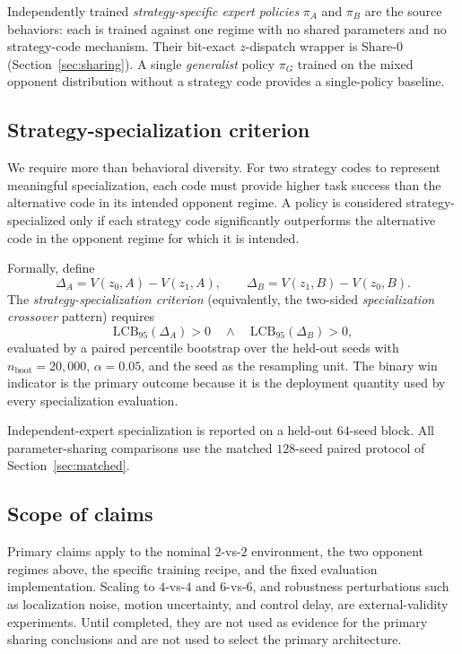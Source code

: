 Independently trained \emph{strategy-specific expert policies} $\pi_A$ and
$\pi_B$ are the source behaviors: each is trained against one regime with no
shared parameters and no strategy-code mechanism. Their bit-exact $z$-dispatch
wrapper is Share-0 (Section~\ref{sec:sharing}). A single \emph{generalist}
policy $\pi_G$ trained on the mixed opponent distribution without a strategy
code provides a single-policy baseline.

\subsection{Strategy-specialization criterion}
\label{sec:specialization}

We require more than behavioral diversity. For two strategy codes to represent
meaningful specialization, each code must provide higher task success than the
alternative code in its intended opponent regime. A policy is considered
strategy-specialized only if each strategy code significantly outperforms the
alternative code in the opponent regime for which it is intended.

Formally, define
\[
\Delta_A = V(z_0,A)-V(z_1,A),
\qquad
\Delta_B = V(z_1,B)-V(z_0,B).
\]
The \emph{strategy-specialization criterion} (equivalently, the two-sided
\emph{specialization crossover} pattern) requires
\[
\mathrm{LCB}_{95}(\Delta_A)>0
\quad\wedge\quad
\mathrm{LCB}_{95}(\Delta_B)>0,
\]
evaluated by a paired percentile bootstrap over the held-out seeds with
$n_{\mathrm{boot}}=20{,}000$, $\alpha=0.05$, and the seed as the resampling
unit. The binary win indicator is the primary outcome because it is the
deployment quantity used by every specialization evaluation.

Independent-expert specialization is reported on a held-out $64$-seed block.
All parameter-sharing comparisons use the matched $128$-seed paired protocol of
Section~\ref{sec:matched}.

\subsection{Scope of claims}

Primary claims apply to the nominal $2$-vs-$2$ environment, the two opponent
regimes above, the specific training recipe, and the fixed evaluation
implementation. Scaling to $4$-vs-$4$ and $6$-vs-$6$, and robustness
perturbations such as localization noise, motion uncertainty, and control delay,
are external-validity experiments. Until completed, they are not used as evidence
for the primary sharing conclusions and are not used to select the primary
architecture.

